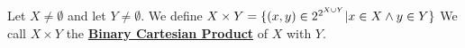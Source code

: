 \newcommand{\BinaryCartesianProduct}[0]{\textbf{\hyperref[def:BinaryCartesianProduct]{Binary Cartesian Product}}\xspace}
\begin{df}
\label{def:BinaryCartesianProduct}

\rm
    Let $X \neq \emptyset$ and let 
    $Y \neq \emptyset$. 
    We define 
    $X \times Y =\{(x,y) \in 2^{2^{X \cup Y}} | x \in X \wedge y \in Y\}$
    We call 
    $X \times Y$ the 
    \BinaryCartesianProduct
    of $X$ with $Y$. 
\end{df}
